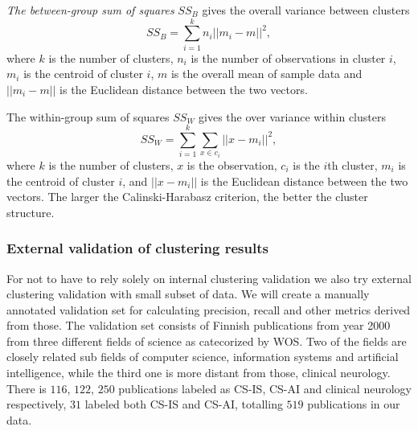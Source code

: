 \emph{The between-group sum of squares} $SS_B$ gives the overall variance
between clusters
\begin{equation}
 SS_B = \sum_{i=1}^k n_i ||m_i-m||^2,
\end{equation}
where $k$ is the number of clusters, $n_i$ is the number of 
observations in cluster $i$, $m_i$ is the centroid of cluster $i$, 
$m$ is the overall mean of sample data and $||m_i-m||$ is the 
Euclidean distance between the two vectors.

The within-group sum of squares $SS_W$ gives the over variance 
within clusters
\begin{equation}
 SS_W = \sum_{i=1}^k \sum_{x\in c_i} ||x-m_i||^2,
\end{equation}
where $k$ is the number of clusters, $x$ is the observation, 
$c_i$ is the $i$th cluster, $m_i$ is the centroid of cluster $i$, and 
$||x-m_i||$ is the Euclidean distance between the two vectors.
The larger the Calinski-Harabasz criterion, the better the 
cluster structure.


\subsubsection{External validation of clustering results}
For not to have to rely solely on internal clustering validation we
also try external clustering validation with small subset of data.
We will create a manually annotated validation set for calculating
precision, recall and other metrics derived from those.
The validation set consists of Finnish publications from year 2000
from three different fields of science as catecorized by WOS.
Two of the fields are closely related sub fields of computer science, 
information systems and artificial intelligence, while the third 
one is more distant from those, clinical neurology. There is $116$,
$122$, $250$ publications labeled as CS-IS, CS-AI and clinical 
neurology respectively, $31$ labeled both CS-IS and CS-AI, totalling 
$519$ publications in our data.


